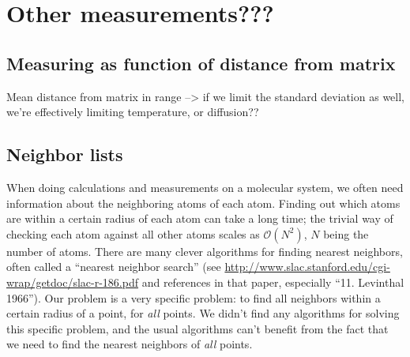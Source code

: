 \chapter{Other measurements???}

\section{Measuring as function of distance from matrix}
Mean distance from matrix in range --> if we limit the standard deviation as well, we're effectively limiting temperature, or diffusion??

\section{Neighbor lists\label{sec:neighbor_lists}}
When doing calculations and measurements on a molecular system, we often need information about the neighboring atoms of each atom. Finding out which atoms are within a certain radius of each atom can take a long time; the trivial way of checking each atom against all other atoms scales as $\mathcal{O}(N^2)$, $N$ being the number of atoms. There are many clever algorithms for finding nearest neighbors, often called a ``nearest neighbor search'' (see \url{http://www.slac.stanford.edu/cgi-wrap/getdoc/slac-r-186.pdf} and references in that paper, especially ``11. Levinthal 1966''). Our problem is a very specific problem: to find all neighbors within a certain radius of a point, for \emph{all} points. We didn't find any algorithms for solving this specific problem, and the usual algorithms can't benefit from the fact that we need to find the nearest neighbors of \emph{all} points.


